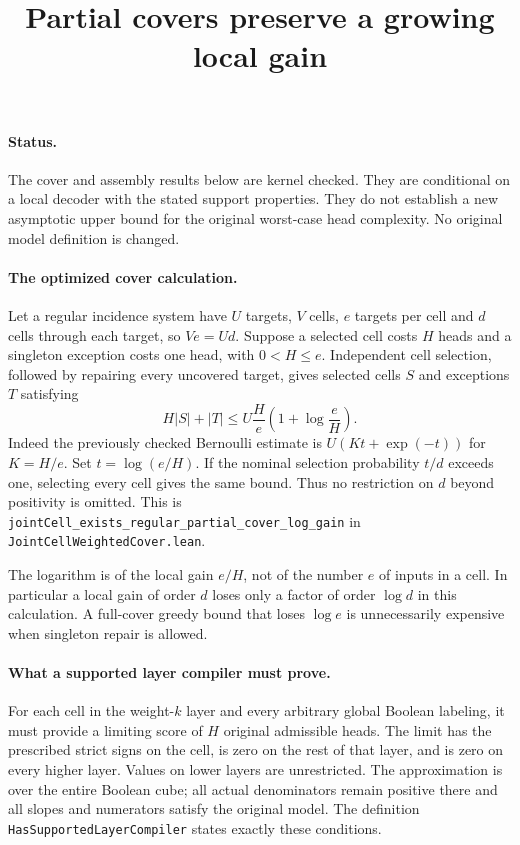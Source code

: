 \documentclass{article}
\begin{document}
\title{Partial covers preserve a growing local gain}
\maketitle

\paragraph{Status.}
The cover and assembly results below are kernel checked. They are conditional
on a local decoder with the stated support properties. They do not establish
a new asymptotic upper bound for the original worst-case head complexity.
No original model definition is changed.

\paragraph{The optimized cover calculation.}
Let a regular incidence system have $U$ targets, $V$ cells, $e$ targets per
cell and $d$ cells through each target, so $Ve=Ud$. Suppose a selected cell
costs $H$ heads and a singleton exception costs one head, with $0<H\leq e$.
Independent cell selection, followed by repairing every uncovered target,
gives selected cells $S$ and exceptions $T$ satisfying
\[
 H|S|+|T|\leq U\frac{H}{e}
 \left(1+\log\frac eH\right).
\]
Indeed the previously checked Bernoulli estimate is
$U(Kt+\exp(-t))$ for $K=H/e$. Set $t=\log(e/H)$.
If the nominal selection probability $t/d$ exceeds one, selecting every
cell gives the same bound. Thus no restriction on $d$ beyond positivity is
omitted. This is
\texttt{jointCell\_exists\_regular\_partial\_cover\_log\_gain} in
\texttt{JointCellWeightedCover.lean}.

The logarithm is of the local gain $e/H$, not of the number $e$ of inputs
in a cell. In particular a local gain of order $d$ loses only a factor
of order $\log d$ in this calculation. A full-cover greedy bound that
loses $\log e$ is unnecessarily expensive when singleton repair is allowed.

\paragraph{What a supported layer compiler must prove.}
For each cell in the weight-$k$ layer and every arbitrary global Boolean
labeling, it must provide a limiting score of $H$ original admissible heads.
The limit has the prescribed strict signs on the cell, is zero on the rest
of that layer, and is zero on every higher layer. Values on lower layers
are unrestricted. The approximation is over the entire Boolean cube;
all actual denominators remain positive there and all slopes and numerators
satisfy the original model. The definition
\texttt{HasSupportedLayerCompiler} states exactly these conditions.
\end{document}
